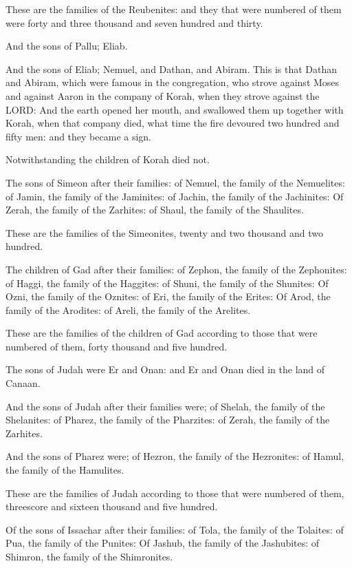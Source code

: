 \verse These are the families of the Reubenites: and they that were
numbered of them were forty and three thousand and seven hundred and
thirty.

\verse And the sons of Pallu; Eliab.

\verse And the sons of Eliab; Nemuel, and Dathan, and Abiram. This is
that Dathan and Abiram, which were famous in the congregation, who
strove against Moses and against Aaron in the company of Korah, when
they strove against the LORD: \verse And the earth opened her mouth,
and swallowed them up together with Korah, when that company died,
what time the fire devoured two hundred and fifty men: and they became
a sign.

\verse Notwithstanding the children of Korah died not.

\verse The sons of Simeon after their families: of Nemuel, the family
of the Nemuelites: of Jamin, the family of the Jaminites: of Jachin,
the family of the Jachinites: \verse Of Zerah, the family of the
Zarhites: of Shaul, the family of the Shaulites.

\verse These are the families of the Simeonites, twenty and two
thousand and two hundred.

\verse The children of Gad after their families: of Zephon, the family
of the Zephonites: of Haggi, the family of the Haggites: of Shuni, the
family of the Shunites: \verse Of Ozni, the family of the Oznites: of
Eri, the family of the Erites: \verse Of Arod, the family of the
Arodites: of Areli, the family of the Arelites.

\verse These are the families of the children of Gad according to those
that were numbered of them, forty thousand and five hundred.

\verse The sons of Judah were Er and Onan: and Er and Onan died in the
land of Canaan.

\verse And the sons of Judah after their families were; of Shelah, the
family of the Shelanites: of Pharez, the family of the Pharzites: of
Zerah, the family of the Zarhites.

\verse And the sons of Pharez were; of Hezron, the family of the
Hezronites: of Hamul, the family of the Hamulites.

\verse These are the families of Judah according to those that were
numbered of them, threescore and sixteen thousand and five hundred.

\verse Of the sons of Issachar after their families: of Tola, the
family of the Tolaites: of Pua, the family of the Punites: \verse Of
Jashub, the family of the Jashubites: of Shimron, the family of the
Shimronites.

